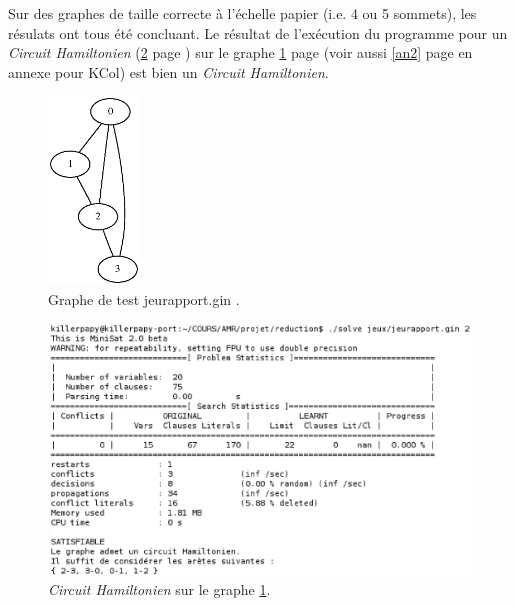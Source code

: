   \indent Sur des graphes de taille correcte à l'échelle papier (i.e. 4
  ou 5 sommets), les résulats ont tous été concluant. Le résultat de
  l'exécution du programme pour un \emph{Circuit Hamiltonien} (\ref{ham}
  page \pageref{ham}) sur le graphe \ref{graphe1} page \pageref{graphe1} 
  (voir aussi \ref{an2} page \pageref{an2} en annexe pour KCol)
  est bien un \emph{Circuit Hamiltonien}.

  \begin{figure}[!ht]
   \begin{center}
    \includegraphics[height=5cm]{images/jeurap.ps}
    \caption{Graphe de test jeurapport.gin .\label{graphe1}}
   \end{center}
  \end{figure}

  \begin{figure}[!ht]
   \begin{center}
    \includegraphics[width=12cm]{images/chemin.eps}
    \caption{\emph{Circuit Hamiltonien} sur le graphe
    \ref{graphe1}.\label{ham}}
   \end{center}
  \end{figure}